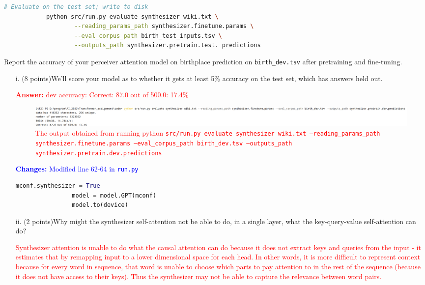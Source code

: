 \documentclass[letterpaper,12pt]{article}
\begin{document}
\begin{itemize}
\begin{lstlisting}[basicstyle=\ttfamily, language=bash]
			# Evaluate on the test set; write to disk
			python src/run.py evaluate synthesizer wiki.txt \
					--reading_params_path synthesizer.finetune.params \
					--eval_corpus_path birth_test_inputs.tsv \
					--outputs_path synthesizer.pretrain.test. predictions
		\end{lstlisting}
		
		Report the accuracy of your perceiver attention model on birthplace prediction on \texttt{birth\_dev.tsv} after pretraining and fine-tuning.
		\begin{itemize}
		\item[i.]
			(8 points)We'll score your model as to whether it gets at least 5\% accuracy on the test set, which has answers held out.
			
			\textcolor{red}{\textbf{Answer:} dev accuracy: Correct: 87.0 out of 500.0: 17.4\%
			\begin{figure}[htbp] 
				\centering 
				\includegraphics[width=\linewidth]{picture/2.g.result}
				\captionsetup{font=small}
				\caption{
					\label{fig: 2.g.result} %
					The output obtained from running python \texttt{src/run.py evaluate synthesizer wiki.txt --reading\_params\_path synthesizer.finetune.params --eval\_corpus\_path birth\_dev.tsv --outputs\_path synthesizer.pretrain.dev.predictions
					}
				}
			\end{figure}
			}
			
			\textcolor{blue}{\textbf{Changes:} Modified line 62-64 in \texttt{run.py}}
			\begin{lstlisting}[language=python, basicstyle=\small\ttfamily]
				mconf.synthesizer = True
				model = model.GPT(mconf)
				model.to(device)
			\end{lstlisting}
			
		\item[ii.]
			(2 points)Why might the synthesizer self-attention not be able to do, in a single layer, what the key-query-value self-attention can do?
			
			\textcolor{red}{ Synthesizer attention is unable to do what the causal attention can do because it does not extract keys and queries from the input - it estimates that by remapping input to a lower dimensional space for each head. In other words, it is more difficult to represent context because for every word in sequence, that word is unable to choose which parts to pay attention to in the rest of the sequence (because it does not have access to their keys). Thus the synthesizer may not be able to capture the relevance between word pairs.}
			
		\end{itemize}
		
	\end{itemize}
	
\end{document}
